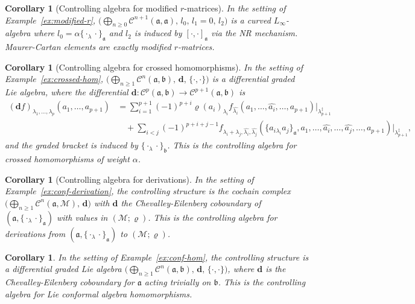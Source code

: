 \documentclass[a4paper,11pt]{article}
\def\Vs{\mathfrak{a}}
\def\Ws{\mathfrak{b}}
\def\Mod{\mathcal{M}}
\def\rep{\varrho}
\def\Cch{\mathscr{C}}
\def\la{\lambda}
\newcommand{\dM}{\mathbf{d}}
\numberwithin{equation}{section}
\newtheorem{corollary}[theorem]{Corollary}
\begin{document}
\begin{corollary}[Controlling algebra for  modified $r$-matrices]
\label{cor:control-modified-r}
In the setting of Example~\ref{ex:modified-r},
$\bigl(\bigoplus_{n\geq0}\Cch^{n+1}(\Vs,\Vs),\,l_0,\,l_1{=}0,\,l_2\bigr)$
is a curved $L_\infty$-algebra where $l_0=\alpha\{\cdot_\la\cdot\}_\Vs$
and $l_2$ is induced by $[\cdot,\cdot]_\Vs$ via the 
NR
mechanism.
Maurer-Cartan elements are exactly  modified $r$-matrices.
\end{corollary}
 
\begin{corollary}[Controlling algebra for  crossed homomorphisms]
\label{cor:control-crossed}
In the setting of Example~\ref{ex:crossed-hom},
$\bigl(\bigoplus_{n\geq1}\Cch^n(\Vs,\Ws),\,\dM,\,\{\cdot,\cdot\}\bigr)$
is a differential graded Lie algebra, where the differential
$\dM:\Cch^p(\Vs,\Ws)\to\Cch^{p+1}(\Vs,\Ws)$ is
\begin{equation}\label{eq:diff-I}
\begin{split}
  (\dM f)_{\la_1,\ldots,\la_p}(a_1,\ldots,a_{p+1})
  &= \sum_{i=1}^{p+1}(-1)^{p+i}\rep(a_i)_{\la_i}
     f_{\widehat{\la_i}}(a_1,\ldots,\widehat{a_i},\ldots,a_{p+1})
     \big|_{\la_{p+1}^\ddag}\\
  &\quad + \sum_{i<j}(-1)^{p+i+j-1}
     f_{\la_i+\la_j,\widehat{\la_i},\widehat{\la_j}}
     (\{a_i{}_{\la_i}a_j\}_\Vs,a_1,\ldots,
     \widehat{a_i},\ldots,\widehat{a_j},\ldots,a_{p+1})
     \big|_{\la_{p+1}^\ddag},
\end{split}
\end{equation}
and the graded bracket is induced by $\{\cdot_\la\cdot\}_\Ws$.
This is the \textit{controlling algebra for  crossed
homomorphisms of weight $\alpha$}.
\end{corollary}
 
\begin{corollary}[Controlling algebra for  derivations]
\label{cor:control-deriv}
In the setting of Example~\ref{ex:conf-derivation}, the controlling
structure is the cochain complex
$\bigl(\bigoplus_{n\geq1}\Cch^n(\Vs,\Mod),\,\dM\bigr)$
with $\dM$ the Chevalley-Eilenberg coboundary of $(\Vs,\{\cdot_\la\cdot\}_\Vs)$
with values in $(\Mod;\rep)$.  This is the \textit{controlling algebra
for derivations} from $(\Vs,\{\cdot_\la\cdot\}_\Vs)$ to
$(\Mod;\rep)$.
\end{corollary}
 
\begin{corollary}
\label{cor:control-hom}
In the setting of Example~\ref{ex:conf-hom}, the controlling structure
is a differential graded Lie algebra
$\bigl(\bigoplus_{n\geq1}\Cch^n(\Vs,\Ws),\,\dM,\,\{\cdot,\cdot\}\bigr)$,
where $\dM$ is the Chevalley-Eilenberg coboundary for $\Vs$ acting
trivially on $\Ws$.  This is the \textit{controlling algebra for
Lie conformal  algebra homomorphisms}.
\end{corollary}
 
\end{document}
